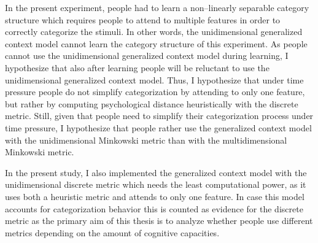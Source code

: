 \documentclass[a4paper,man,natbib]{apa6}
\begin{document}
In the present experiment, people had to learn a non--linearly separable category structure which requires people to attend to multiple features in order to correctly categorize the stimuli. In other words, the unidimensional generalized context model cannot learn the category structure of this experiment. As people cannot use the unidimensional generalized context model during learning, I hypothesize that also after learning people will be reluctant to use the unidimensional generalized context model. Thus, I hypothesize that under time pressure people do not simplify categorization by attending to only one feature, but rather by computing psychological distance heuristically with the discrete metric. Still, given that people need to simplify their categorization process under time pressure, I hypothesize that people rather use the generalized context model with the unidimensional Minkowski metric than with the multidimensional Minkowski metric. 

In the present study, I also implemented the generalized context model with the unidimensional discrete metric which needs the least computational power, as it uses both a heuristic metric and attends to only one feature. In case this model accounts for categorization behavior this is counted as evidence for the discrete metric as the primary aim of this thesis is to analyze whether people use different metrics depending on the amount of cognitive capacities.
\end{document}

